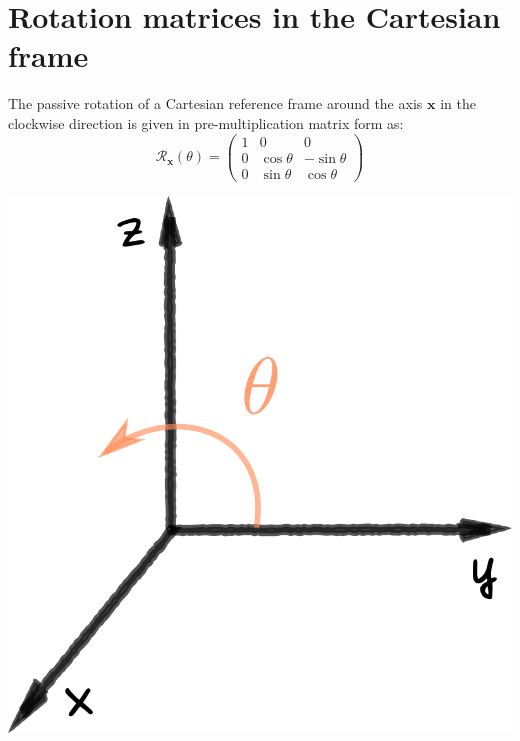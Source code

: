 \chapter{Rotation matrices in the Cartesian frame}
\label{Chap:rotations}


\vspace{0.2cm}

\noindent\begin{minipage}{0.47\textwidth}
The passive rotation of a Cartesian reference frame around the axis $\mathbf{x}$ in the clockwise direction is given in pre-multiplication matrix form as: 
\begin{equation*}
\mathcal{R}_\mathbf{x}(\theta)=\begin{pmatrix}
1 &  0           & 0 \\
0 & \cos{\theta} & -\sin{\theta} \\
0 & \sin{\theta} & \cos{\theta}
\end{pmatrix}
\label{eq:RotMat}
\end{equation*}
\end{minipage}
\begin{minipage}{0.5\textwidth}
\centering
\includegraphics[width=0.45\linewidth]{Figures/Rx.png}
\end{minipage}

\vspace{.3cm}


